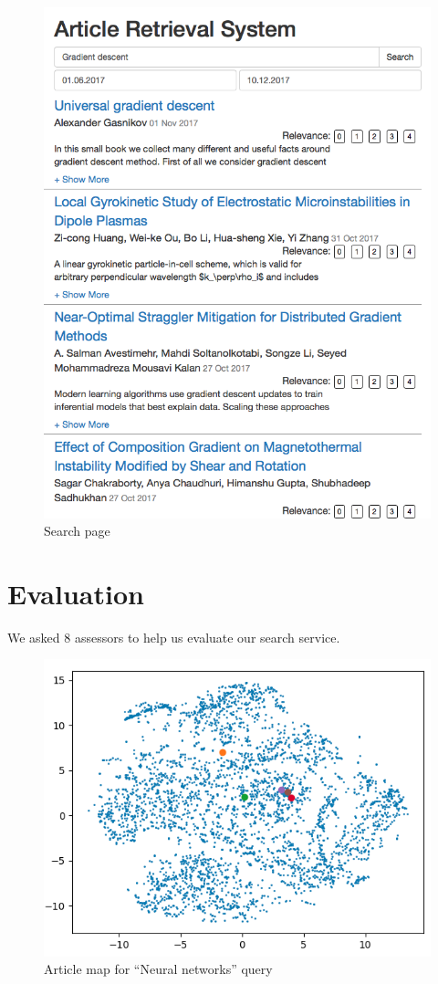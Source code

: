 \begin{figure}
  \includegraphics[width=\linewidth]{screenshot_1.png}
  \caption{Search page}
  \label{fig:search_page}
\end{figure}

\section{Evaluation}

We asked 8 assessors to help us evaluate our search service. 

\begin{figure}
  \includegraphics[width=\linewidth]{screenshot_3.png}
  \caption{Article map for ``Neural networks'' query}
  \label{fig:article_map}
\end{figure}


